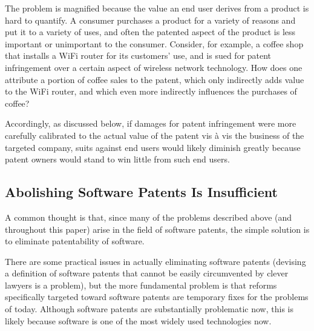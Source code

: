 \documentclass[11pt,twocolumn,titlepage]{article}
\begin{document}
The problem is magnified because the value an end user derives from a product is
hard to quantify. A consumer purchases a product for a variety of reasons and
put it to a variety of uses, and often the patented aspect of the product is
less important or unimportant to the consumer. Consider, for example, a coffee
shop that installs a WiFi router for its customers' use, and is sued for patent
infringement over a certain aspect of wireless network technology. How does one
attribute a portion of coffee sales to the patent, which only indirectly adds
value to the WiFi router, and which even more indirectly influences the
purchases of coffee?

Accordingly, as discussed below, if damages
for patent infringement were more carefully calibrated
to the actual value of the patent vis à vis the business of the targeted
company, suits against end users would likely diminish greatly because patent
owners would stand to win little from such end users.
\fi

\subsection{Abolishing Software Patents Is Insufficient}
\SectionNote

A common thought is that, since
many of the problems described above (and throughout this paper) arise in the
field of software patents, the simple solution is to eliminate patentability of
software.

There are some practical issues in actually eliminating software patents
(devising a definition of software patents that cannot be easily circumvented by
clever lawyers is a problem),
but the more fundamental problem is that reforms specifically targeted toward
software patents are temporary fixes for the problems of today.
Although software patents are
substantially problematic now,
this is likely because software is one of the
most widely used technologies now.
\end{document}
